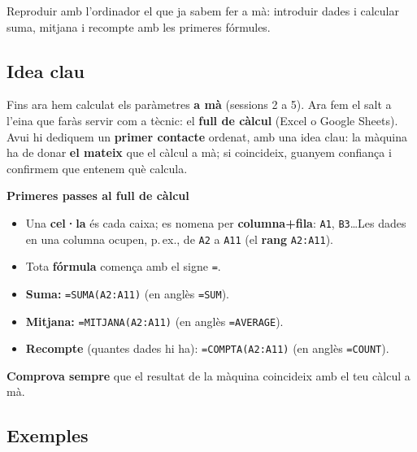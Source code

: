 %
{Reproduir amb l'ordinador el que ja sabem fer a mà: introduir dades i calcular suma, mitjana i recompte amb les primeres fórmules.}

\subsection{Idea clau}

Fins ara hem calculat els paràmetres \textbf{a mà} (sessions 2 a 5). Ara fem el salt
a l'eina que faràs servir com a tècnic: el \textbf{full de càlcul} (Excel o Google
Sheets). Avui hi dediquem un \textbf{primer contacte} ordenat, amb una idea clau: la
màquina ha de donar \textbf{el mateix} que el càlcul a mà; si coincideix, guanyem
confiança i confirmem que entenem què calcula.

\begin{idea}
\textbf{Primeres passes al full de càlcul}
\begin{itemize}[leftmargin=1.4em, itemsep=2pt]
  \item Una \textbf{cel·la} és cada caixa; es nomena per \textbf{columna+fila}: \texttt{A1},
        \texttt{B3}\dots Les dades en una columna ocupen, p.\,ex., de \texttt{A2} a
        \texttt{A11} (el \textbf{rang} \texttt{A2:A11}).
  \item Tota \textbf{fórmula} comença amb el signe \texttt{=}.
  \item \textbf{Suma:} \texttt{=SUMA(A2:A11)} \quad (en anglès \texttt{=SUM}).
  \item \textbf{Mitjana:} \texttt{=MITJANA(A2:A11)} \quad (en anglès \texttt{=AVERAGE}).
  \item \textbf{Recompte} (quantes dades hi ha): \texttt{=COMPTA(A2:A11)} \quad
        (en anglès \texttt{=COUNT}).
\end{itemize}
\textbf{Comprova sempre} que el resultat de la màquina coincideix amb el teu càlcul a
mà.
\end{idea}

\subsection{Exemples}

